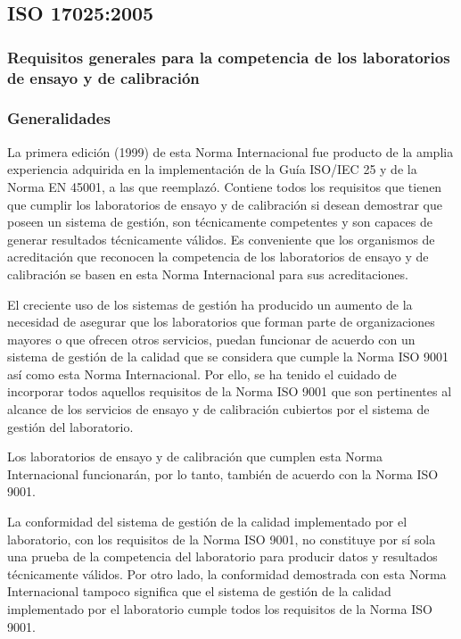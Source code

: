 \subsection{ISO 17025:2005}
	\subsubsection*{Requisitos generales para la competencia de los laboratorios de ensayo y de calibración}
	
	\subsubsection{Generalidades}
		\par 
			La primera edición (1999) de esta Norma Internacional fue producto de la amplia experiencia adquirida en la
			implementación de la Guía ISO/IEC 25 y de la Norma EN 45001, a las que reemplazó. Contiene todos los
			requisitos que tienen que cumplir los laboratorios de ensayo y de calibración si desean demostrar que poseen
			un sistema de gestión, son técnicamente competentes y son capaces de generar resultados técnicamente
			válidos. Es conveniente que los organismos de acreditación que reconocen la competencia de los laboratorios de
			ensayo y de calibración se basen en esta Norma Internacional para sus acreditaciones.
			
		\par \noindent
			El creciente uso de los sistemas de gestión ha producido un aumento de la necesidad de asegurar que los
			laboratorios que forman parte de organizaciones mayores o que ofrecen otros servicios, puedan funcionar de
			acuerdo con un sistema de gestión de la calidad que se considera que cumple la Norma ISO 9001 así como
			esta Norma Internacional. Por ello, se ha tenido el cuidado de incorporar todos aquellos requisitos de la
			Norma ISO 9001 que son pertinentes al alcance de los servicios de ensayo y de calibración cubiertos por el
			sistema de gestión del laboratorio.
		
		\par \noindent
			Los laboratorios de ensayo y de calibración que cumplen esta Norma Internacional funcionarán, por lo tanto,
			también de acuerdo con la Norma ISO 9001.
		
		\par \noindent
			La conformidad del sistema de gestión de la calidad implementado por el laboratorio, con los requisitos de la
			Norma ISO 9001, no constituye por sí sola una prueba de la competencia del laboratorio para producir datos
			y resultados técnicamente válidos. Por otro lado, la conformidad demostrada con esta Norma Internacional
			tampoco significa que el sistema de gestión de la calidad implementado por el laboratorio cumple todos los
			requisitos de la Norma ISO 9001.
			
